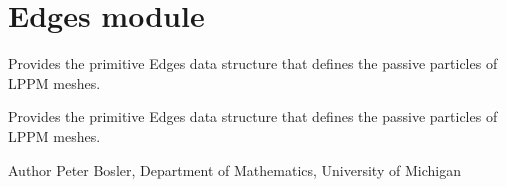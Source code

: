 \hypertarget{group__Edges}{\section{Edges module}
\label{group__Edges}
}


Provides the primitive Edges data structure that defines the passive particles of L\+P\+P\+M meshes.  


Provides the primitive Edges data structure that defines the passive particles of L\+P\+P\+M meshes. 

\begin{DoxyAuthor}{Author}
Peter Bosler, Department of Mathematics, University of Michigan 
\end{DoxyAuthor}
